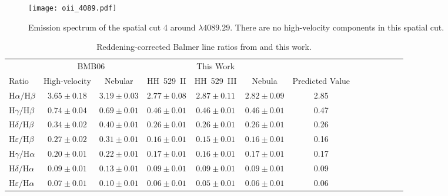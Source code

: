\documentclass[fleqn,usenatbib]{mnras}
\begin{document}
\begin{figure}
\texttt{[image: oii\_4089.pdf]}
\caption{Emission spectrum of the spatial cut 4 around $\lambda 4089.29$. There are no high-velocity components in this spatial cut.}
\label{fig:oii_4089}
\end{figure}








\begin{table*}
\centering
\caption{Reddening-corrected Balmer line ratios from \citet{Blagrave06} and this work.}
\label{tab:comparison_balmer}
\begin{tabular}{lcccccccccccc}
\hline
 & \multicolumn{2}{c}{BMB06} & \multicolumn{3}{c}{This Work} & \\
Ratio &  High-velocity &  Nebular &  HH~529~II & HH~529~III &  Nebula & Predicted Value\\
\hline
$\text{H}\alpha/\text{H}\beta$ & $3.65 \pm 0.18$ & $3.19\pm 0.03$ & $2.77 \pm 0.08$ & $2.87 \pm 0.11$ & $2.82 \pm 0.09$ & 2.85\\
$\text{H}\gamma/\text{H}\beta$ & $0.74 \pm 0.04$ & $0.69\pm 0.01$ & $0.46 \pm 0.01$ & $0.46 \pm 0.01$ & $0.46 \pm 0.01$ & 0.47\\
$\text{H}\delta/\text{H}\beta$ & $0.34 \pm 0.02$ & $0.40\pm 0.01$ & $0.26 \pm 0.01$ & $0.26 \pm 0.01$ & $0.26 \pm 0.01$ & 0.26\\
$\text{H}\varepsilon/\text{H}\beta$ & $0.27 \pm 0.02$ & $0.31\pm 0.01$ & $0.16 \pm 0.01$ & $0.15 \pm 0.01$ & $0.16 \pm 0.01$& 0.16 \\
$\text{H}\gamma/\text{H}\alpha$ & $0.20 \pm 0.01$ & $0.22\pm 0.01$ & $0.17 \pm 0.01$ & $0.16 \pm 0.01$ & $0.17 \pm 0.01$ & 0.17\\
$\text{H}\delta/\text{H}\alpha$ & $0.09\pm 0.01$ & $0.13 \pm 0.01$ & $0.09 \pm 0.01$ & $0.09 \pm 0.01$ & $0.09 \pm 0.01$ & 0.09\\
$\text{H}\varepsilon/\text{H}\alpha$ & $ 0.07 \pm 0.01$ & $0.10\pm 0.01$ & $0.06 \pm 0.01$ & $0.05 \pm 0.01$ & $0.06 \pm 0.01$ &0.06\\
\hline
\end{tabular}
\end{table*}
\end{document}
